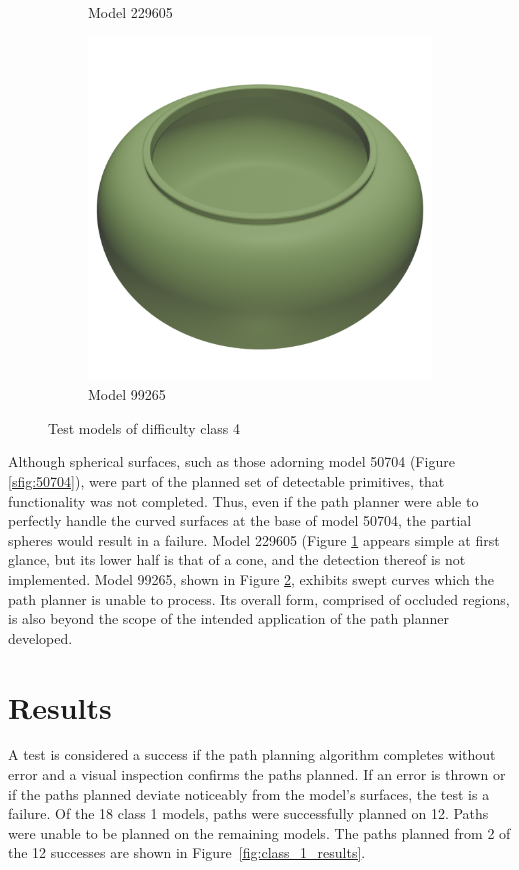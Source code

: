 \begin{figure}[htb]
\begin{subfigure}{0.3\textwidth}
	\caption{Model 229605}
	\label{sfig:229605}
\end{subfigure}
\hfill
\begin{subfigure}{0.3\textwidth}
	\includegraphics[width=\textwidth]{../resources/models/99265.png}
	\caption{Model 99265}
	\label{sfig:99265}
\end{subfigure}
\caption{Test models of difficulty class 4}
\label{fig:class_4_models}
\end{figure}

Although spherical surfaces, such as those adorning model 50704 (Figure \ref{sfig:50704}), were part of the planned set of detectable primitives, that functionality was not completed.
Thus, even if the path planner were able to perfectly handle the curved surfaces at the base of model 50704, the partial spheres would result in a failure.
Model 229605 (Figure \ref{sfig:229605} appears simple at first glance, but its lower half is that of a cone, and the detection thereof is not implemented.
Model 99265, shown in Figure \ref{sfig:99265}, exhibits swept curves which the path planner is unable to process.
Its overall form, comprised of occluded regions, is also beyond the scope of the intended application of the path planner developed.


\section{Results}
A test is considered a success if the path planning algorithm completes without error and a visual inspection confirms the paths planned.
If an error is thrown or if the paths planned deviate noticeably from the model's surfaces, the test is a failure.
Of the 18 class 1 models, paths were successfully planned on 12.
Paths were unable to be planned on the remaining models.
The paths planned from 2 of the 12 successes are shown in Figure~\ref{fig:class_1_results}.

